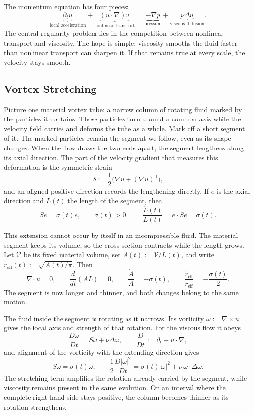 
The momentum equation has four pieces:
\[
  \underbrace{\partial_t u}_{\text{local acceleration}}
  +
  \underbrace{(u\cdot\nabla)u}_{\text{nonlinear transport}}
  =
  \underbrace{-\nabla p}_{\text{pressure}}
  +
  \underbrace{\nu\Delta u}_{\text{viscous diffusion}}.
\]
The central regularity problem lies in the competition between nonlinear transport and viscosity.
The hope is simple: viscosity smooths the fluid faster than nonlinear transport can sharpen it.
If that remains true at every scale, the velocity stays smooth.

\subsection{Vortex Stretching}\label{sub:ThePerfectlyStretchingVortex}

Picture one material vortex tube: a narrow column of rotating fluid marked by the particles it contains.
Those particles turn around a common axis while the velocity field carries and deforms the tube as a whole.
Mark off a short segment of it.
The marked particles remain the segment we follow, even as its shape changes.
When the flow draws the two ends apart, the segment lengthens along its axial direction.
The part of the velocity gradient that measures this deformation is the symmetric strain
\[
  S:=\frac12\bigl(\nabla u+(\nabla u)^{\mathsf T}\bigr),
\]
and an aligned positive direction records the lengthening directly.
If \(e\) is the axial direction and \(L(t)\) the length of the segment, then
\[
  Se=\sigma(t)e,
  \qquad
  \sigma(t)>0,
  \qquad
  \frac{\dot L(t)}{L(t)}
  =
  e\cdot Se
  =
  \sigma(t).
\]

This extension cannot occur by itself in an incompressible fluid.
The material segment keeps its volume, so the cross-section contracts while the length grows.
Let \(\mathcal V\) be its fixed material volume, set \(A(t):=\mathcal V/L(t)\), and write \(r_{\mathrm{eff}}(t):=\sqrt{A(t)/\pi}\).
Then
\[
  \nabla\cdot u=0,
  \qquad
  \frac{d}{dt}(A L)=0,
  \qquad
  \frac{\dot A}{A}=-\sigma(t),
  \qquad
  \frac{\dot r_{\mathrm{eff}}}{r_{\mathrm{eff}}}
  =
  -\frac{\sigma(t)}{2}.
\]
The segment is now longer and thinner, and both changes belong to the same motion.

The fluid inside the segment is rotating as it narrows.
Its vorticity \(\omega:=\nabla\times u\) gives the local axis and strength of that rotation.
For the viscous flow it obeys
\[
  \frac{D\omega}{Dt}
  =
  S\omega+\nu\Delta\omega,
  \qquad
  \frac{D}{Dt}
  :=
  \partial_t+u\cdot\nabla,
\]
and alignment of the vorticity with the extending direction gives
\[
  S\omega
  =
  \sigma(t)\omega,
  \qquad
  \frac12\frac{D|\omega|^2}{Dt}
  =
  \sigma(t)|\omega|^2
  +
  \nu\,\omega\cdot\Delta\omega.
\]
The stretching term amplifies the rotation already carried by the segment, while viscosity remains present in the same evolution.
On an interval where the complete right-hand side stays positive, the column becomes thinner as its rotation strengthens.

